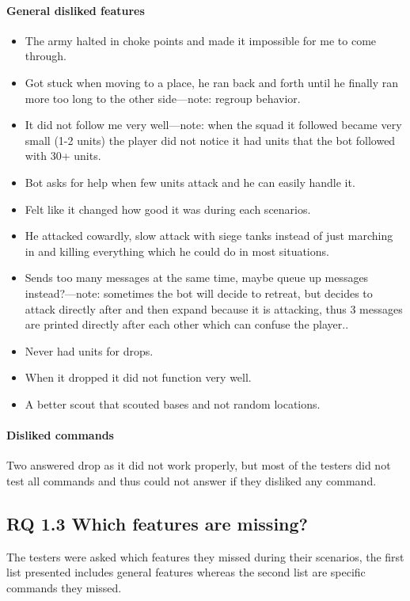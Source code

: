 \paragraph{General disliked features}
\begin{itemize}
	\item The army halted in choke points and made it impossible for me to come through.
	\item Got stuck when moving to a place, he ran back and forth until he finally ran more too long
		to the other side—note: regroup behavior.
	\item It did not follow me very well—note: when the squad it followed became very small (1-2
		units) the player did not notice it had units that the bot followed with 30+ units.
	\item Bot asks for help when few units attack and he can easily handle it.
	\item Felt like it changed how good it was during each scenarios.
	\item He attacked cowardly, slow attack with siege tanks instead of just marching in and killing
		everything which he could do in most situations.
	\item Sends too many messages at the same time, maybe queue up messages instead?—note: sometimes
		the bot will decide to retreat, but decides to attack directly after and then expand
		because it is attacking, thus 3 messages are printed directly after each other which can
		confuse the player..
	\item Never had units for drops.
	\item When it dropped it did not function very well.
	\item A better scout that scouted bases and not random locations.
\end{itemize}

\paragraph{Disliked commands}Two answered drop as it did not work properly, but most of the testers did not test all commands and thus could not answer if they disliked any command.

\subsection{RQ 1.3 Which features are missing?}
The testers were asked which features they missed during their scenarios, the first list presented includes general features whereas the second list are specific commands they missed.
